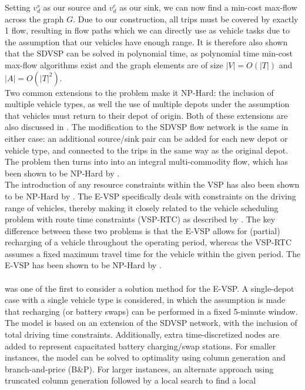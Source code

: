 \documentclass[]{article}
\begin{document}
Setting $v^s_d$ as our source and $v_d^e$ as our sink, we can now find a min-cost max-flow across the graph $G$. Due to our construction, all trips must be covered by exactly 1 flow, resulting in flow paths which we can directly use as vehicle tasks due to the assumption that our vehicles have enough range. It is therefore also shown that the SDVSP can be solved in polynomial time, as polynomial time min-cost max-flow algorithms exist and the graph elements are of size $|V| = O(|T|)$ and $|A| = O(|T|^2)$.\\
Two common extensions to the problem make it NP-Hard: the inclusion of multiple vehicle types, as well the use of multiple depots under the assumption that vehicles must return to their depot of origin. Both of these extensions are also discussed in \citet{Bunte2009}. The modification to the SDVSP flow network is the same in either case: an additional source/sink pair can be added for each new depot or vehicle type, and connected to the trips in the same way as the original depot. The problem then turns into into an integral multi-commodity flow, which has been shown to be NP-Hard by \citet{Even1975}. \\
The introduction of any resource constraints within the VSP has also been shown to be NP-Hard by
\citet{Bodin1983}. The E-VSP specifically deals with constraints on the driving range of vehicles, thereby making it closely related to the vehicle scheduling problem with route time constraints (VSP-RTC) as described by \citet{Haghani2002}. The key difference between these two problems is that the
E-VSP allows for (partial) recharging of a vehicle throughout the operating
period, whereas the VSP-RTC assumes a fixed maximum travel time for the
vehicle within the given period. The E-VSP has been shown to be NP-Hard by \citet{Sassi2014}. \\\\
\citet{Li2014} was one of the first to consider a solution method for the E-VSP. A single-depot case with a single vehicle type is considered, in which the assumption is made that recharging (or battery swaps) can be performed in a fixed 5-minute window. The model is based on an extension of the SDVSP network, with the inclusion of total driving time constraints. Additionally, extra time-discretized nodes are added to represent capacitated battery charging/swap stations. For smaller instances, the model can be solved to optimality using column generation and branch-and-price (B\&P). For larger instances, an alternate approach using truncated column generation followed by a local search to find a local
\end{document}
